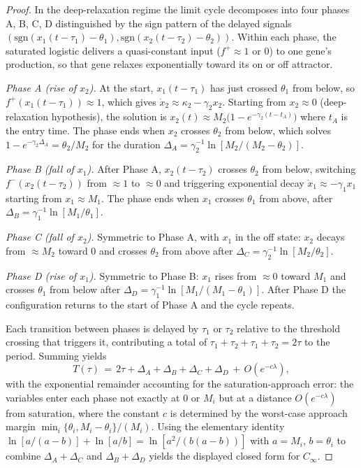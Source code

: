 \documentclass[sn-mathphys,Numbered]{sn-jnl}
\theoremstyle{thmstyleone}
\theoremstyle{thmstyletwo}
\theoremstyle{thmstylethree}
\begin{document}
\begin{proof}
In the deep-relaxation regime the limit cycle decomposes into four
phases A, B, C, D distinguished by the sign pattern of the delayed
signals
$(\mathrm{sgn}(x_1(t-\tau_1)-\theta_1),
  \mathrm{sgn}(x_2(t-\tau_2)-\theta_2))$. Within each phase, the
saturated logistic delivers a quasi-constant input ($f^+\approx 1$ or
$0$) to one gene's production, so that gene relaxes exponentially
toward its on or off attractor.

\emph{Phase A (rise of $x_2$).} At the start, $x_1(t-\tau_1)$ has just
crossed $\theta_1$ from below, so $f^+(x_1(t-\tau_1))\approx 1$, which
gives $\dot{x}_2 \approx \kappa_2-\gamma_2 x_2$. Starting from
$x_2\approx 0$ (deep-relaxation hypothesis), the solution is
$x_2(t)\approx M_2\bigl(1-e^{-\gamma_2(t-t_A)}\bigr)$ where $t_A$ is the
entry time. The phase ends when $x_2$ crosses $\theta_2$ from below,
which solves $1-e^{-\gamma_2\Delta_A} = \theta_2/M_2$ for the duration
$\Delta_A=\gamma_2^{-1}\ln[M_2/(M_2-\theta_2)]$.

\emph{Phase B (fall of $x_1$).} After Phase A, $x_2(t-\tau_2)$ crosses
$\theta_2$ from below, switching $f^-(x_2(t-\tau_2))$ from $\approx 1$
to $\approx 0$ and triggering exponential decay
$\dot{x}_1\approx -\gamma_1 x_1$ starting from $x_1\approx M_1$. The
phase ends when $x_1$ crosses $\theta_1$ from above, after
$\Delta_B=\gamma_1^{-1}\ln[M_1/\theta_1]$.

\emph{Phase C (fall of $x_2$).} Symmetric to Phase A, with $x_1$ in the
off state: $x_2$ decays from $\approx M_2$ toward $0$ and crosses
$\theta_2$ from above after $\Delta_C=\gamma_2^{-1}\ln[M_2/\theta_2]$.

\emph{Phase D (rise of $x_1$).} Symmetric to Phase B: $x_1$ rises from
$\approx 0$ toward $M_1$ and crosses $\theta_1$ from below after
$\Delta_D=\gamma_1^{-1}\ln[M_1/(M_1-\theta_1)]$. After Phase D the
configuration returns to the start of Phase A and the cycle repeats.

Each transition between phases is delayed by $\tau_1$ or $\tau_2$
relative to the threshold crossing that triggers it, contributing a
total of $\tau_1+\tau_2+\tau_1+\tau_2 = 2\tau$ to the period.
Summing yields
\begin{equation*}
T(\tau) \,=\, 2\tau + \Delta_A + \Delta_B + \Delta_C + \Delta_D
\,+\, O(e^{-c\lambda}),
\end{equation*}
with the exponential remainder accounting for the
saturation-approach error: the variables enter each phase not exactly
at $0$ or $M_i$ but at a distance $O(e^{-c\lambda})$ from saturation,
where the constant $c$ is determined by the worst-case approach margin
$\min_i\{\theta_i,M_i-\theta_i\}/(M_i)$. Using the elementary identity
$\ln[a/(a-b)]+\ln[a/b]=\ln[a^2/(b(a-b))]$ with $a=M_i$, $b=\theta_i$
to combine $\Delta_A+\Delta_C$ and $\Delta_B+\Delta_D$ yields the
displayed closed form for $C_\infty$.
\end{proof}
\end{document}
